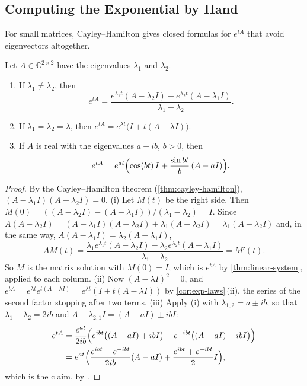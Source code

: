 \subsection{Computing the Exponential by Hand}

For small matrices, Cayley--Hamilton gives closed formulas for $e^{tA}$ that avoid eigenvectors altogether.

\begin{proposition}
\label{prop:exp-2x2}
Let $A\in\mathbb C^{2\times2}$ have the eigenvalues $\lambda_1$ and $\lambda_2$.
\begin{enumerate}
\item If $\lambda_1\ne\lambda_2$, then
\[
e^{tA}=\frac{e^{\lambda_1t}(A-\lambda_2I)-e^{\lambda_2t}(A-\lambda_1I)}{\lambda_1-\lambda_2}.
\]
\item If $\lambda_1=\lambda_2=\lambda$, then $e^{tA}=e^{\lambda t}\bigl(I+t(A-\lambda I)\bigr)$.
\item If $A$ is real with the eigenvalues $a\pm ib$, $b>0$, then
\[
e^{tA}=e^{at}\Bigl(\cos(bt)\,I+\frac{\sin bt}b\,(A-aI)\Bigr).
\]
\end{enumerate}
\end{proposition}

\begin{proof}
By the Cayley--Hamilton theorem (\cref{thm:cayley-hamilton}), $(A-\lambda_1I)(A-\lambda_2I)=0$. (i) Let $M(t)$ be the right side. Then $M(0)=((A-\lambda_2I)-(A-\lambda_1I))/(\lambda_1-\lambda_2)=I$. Since $A(A-\lambda_2I)=(A-\lambda_1I)(A-\lambda_2I)+\lambda_1(A-\lambda_2I)=\lambda_1(A-\lambda_2I)$ and, in the same way, $A(A-\lambda_1I)=\lambda_2(A-\lambda_1I)$,
\[
AM(t)=\frac{\lambda_1e^{\lambda_1t}(A-\lambda_2I)-\lambda_2e^{\lambda_2t}(A-\lambda_1I)}{\lambda_1-\lambda_2}=M'(t).
\]
So $M$ is the matrix solution with $M(0)=I$, which is $e^{tA}$ by \cref{thm:linear-system}, applied to each column. (ii) Now $(A-\lambda I)^2=0$, and $e^{tA}=e^{\lambda t}e^{t(A-\lambda I)}=e^{\lambda t}(I+t(A-\lambda I))$ by \cref{cor:exp-laws}\,(ii), the series of the second factor stopping after two terms. (iii) Apply (i) with $\lambda_{1,2}=a\pm ib$, so that $\lambda_1-\lambda_2=2ib$ and $A-\lambda_{2,1}I=(A-aI)\pm ibI$:
\[
\begin{aligned}
e^{tA}&=\frac{e^{at}}{2ib}\Bigl(e^{ibt}\bigl((A-aI)+ibI\bigr)-e^{-ibt}\bigl((A-aI)-ibI\bigr)\Bigr)\\
&=e^{at}\Bigl(\frac{e^{ibt}-e^{-ibt}}{2ib}(A-aI)+\frac{e^{ibt}+e^{-ibt}}2I\Bigr),
\end{aligned}
\]
which is the claim, by .
\end{proof}

